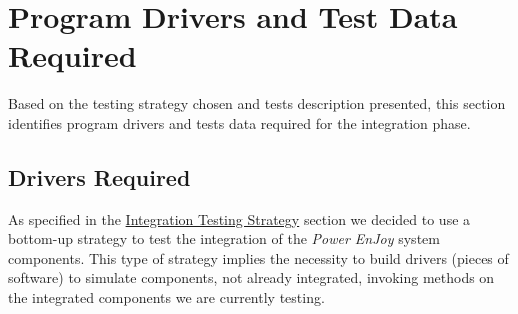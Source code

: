 \section{Program Drivers and Test Data Required}
Based on the testing strategy chosen and tests description presented, this section identifies program drivers and tests data required for the integration phase.

\subsection{Drivers Required}
As specified in the \hyperref[sec:intStrategy]{Integration Testing Strategy} section we decided to use a bottom-up strategy to test the integration of the \emph{Power EnJoy} system components. This type of strategy implies the necessity to build drivers (pieces of software) to simulate components, not already integrated, invoking methods on the integrated components we are currently testing. \\

